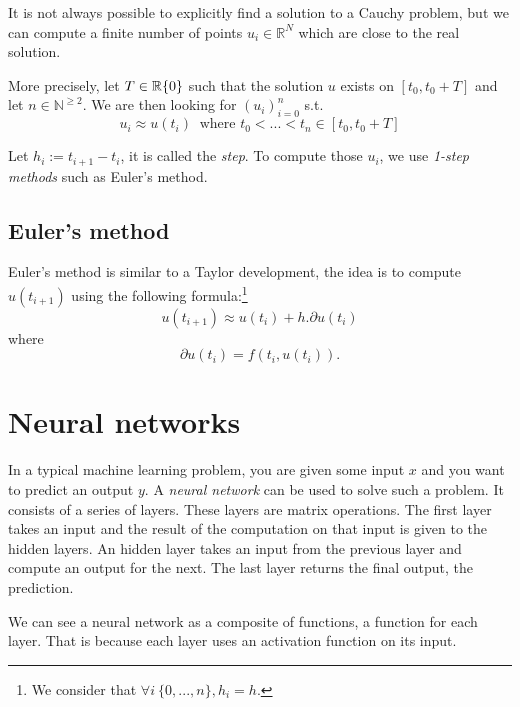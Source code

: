 \documentclass[10pt,a4paper]{article}
\theoremstyle{definition}
\theoremstyle{theorem}
\begin{document}
It is not always possible to explicitly find a solution to a Cauchy problem, but we can compute a finite number of points $u_i \in \mathbb{R}^N$ which are close to the real solution. 

More precisely, let $T \in \mathbb{R}\\\{0\}$ such that the solution $u$ exists on $[t_0, t_0 + T]$ and let $n \in \mathbb{N}^{\geqslant 2}$. We are then looking for $(u_i)^n_{i=0}$ s.t. 
\[
u_i \approx u(t_i) \ \text{ where } t_0 < ... < t_n \in [t_0, t_0 + T]
\]

Let $h_i := t_{i+1} - t_i$, it is called the \textit{step}. To compute those $u_i$, we use \textit{1-step methods} such as Euler's method.

\subsection{Euler's method}

Euler's method is similar to a Taylor development, the idea is to compute $u(t_{i+1})$ using the following formula:\footnote{We consider that $ \forall i\ \{0,...,n\}, h_i = h$.}
\[
u(t_{i+1}) \approx u(t_i) + h . \partial u(t_i)
\]
where 
\[
\partial u(t_i) = f(t_i, u(t_i)).
\]

\section{Neural networks}

In a typical machine learning problem, you are given some input $x$ and you want to predict an output $y$. A \textit{neural network} can be used to solve such a problem. It consists of a series of layers. These layers are matrix operations. The first layer takes an input and the result of the computation on that input is given to the hidden layers. An hidden layer takes an input from the previous layer and compute an output for the next. The last layer returns the final output, the prediction. 

We can see a neural network as a composite of functions, a function for each layer. That is because each layer uses an activation function on its input. 
\end{document}
